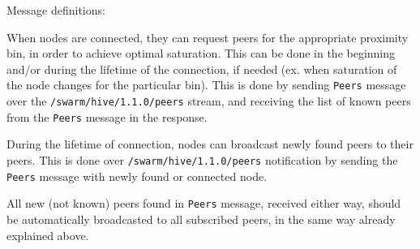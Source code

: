 Message definitions:
\begin{Shaded}
\begin{Highlighting}[]
\NormalTok{;}


    \NormalTok{;}
\NormalTok{\}}

    \NormalTok{;}
    \NormalTok{;}
    \NormalTok{;}
    \NormalTok{;}
\NormalTok{\}}
\end{Highlighting}
\end{Shaded}

When nodes are connected, they can request peers for the appropriate
proximity bin, in order to achieve optimal saturation. This can be done
in the beginning and/or during the lifetime of the connection, if needed
(ex. when saturation of the node changes for the particular bin). This
is done by sending \texttt{Peers} message over the
\texttt{/swarm/hive/1.1.0/peers} stream, and receiving the list of known
peers from the \texttt{Peers} message in the response.

During the lifetime of connection, nodes can broadcast newly found peers
to their peers. This is done over \texttt{/swarm/hive/1.1.0/peers}
notification by sending the \texttt{Peers} message with newly found or
connected node.

All new (not known) peers found in \texttt{Peers} message, received
either way, should be automatically broadcasted to all subscribed peers,
in the same way already explained above.





